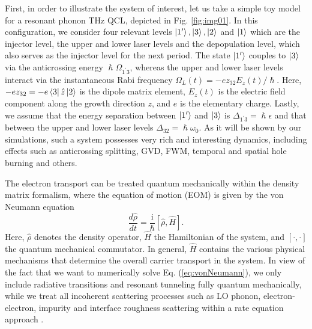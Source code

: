 \documentclass[10pt]{article}
\begin{document}
	First, in order to illustrate the system of interest, let us take a simple
	toy model for a resonant phonon THz QCL, depicted in Fig. \ref{fig:img01}. In this
	configuration, we consider four relevant levels $\Ket{1'},\Ket{3},\Ket{2}$ and
	$\Ket{1}$ which are the injector level, the upper and lower laser levels and
	the depopulation level, which also serves as the injector level for the next
	period. The state $\Ket{1'}$ couples to $\Ket{3}$ via the anticrossing energy
	$\hslash\Omega_{1^{\prime}3}$, whereas the upper and lower laser levels interact
	via the instantaneous Rabi frequency $\Omega_{L}(t)=-ez_{32}E_{z}(t)/\hslash$.
	Here, $-ez_{32}=-e\Bra{3}\hat{z}\Ket{2}$ is the dipole matrix element,
	$E_{z}(t)$ is the electric field component along the growth direction $z$, and
	$e$ is the elementary charge. Lastly, we assume that the energy separation
	between $\Ket{1'}$ and $\Ket{3}$ is $\Delta_{1^{\prime}3}=\hslash\epsilon$ and
	that between the upper and lower laser levels $\Delta_{32}=\hslash\omega_{0}$.
	As it will be shown by our simulations, such a system possesses very rich and
	interesting dynamics, including effects such as anticrossing splitting, GVD,
	FWM, temporal and spatial hole burning and others.
	
	The electron transport can be treated quantum mechanically within the density
	matrix formalism, where the equation of motion (EOM) is given by the von
	Neumann equation
	\begin{equation}
		\frac{d\hat{\rho}}{dt}=\frac{\mathrm{i}}{\hslash}[\hat{\rho},\hat{H}].
		\label{eq:vonNeumann}%
	\end{equation}
	Here, $\hat{\rho}$ denotes the density operator, $\hat{H}$ the Hamiltonian of
	the system, and $[\cdot,\cdot]$ the quantum mechanical commutator. In general,
	$\hat{H}$ contains the various physical mechanisms that determine the overall
	carrier transport in the system. In view of the fact that we want to
	numerically solve Eq. (\ref{eq:vonNeumann}), we only include radiative
	transitions and resonant tunneling fully quantum mechanically, while we treat
	all incoherent scattering processes such as LO phonon, electron-electron,
	impurity and interface roughness scattering within a rate equation approach
	\cite{jirauschek2014modeling,iotti2005microscopic}.
	
\end{document}
